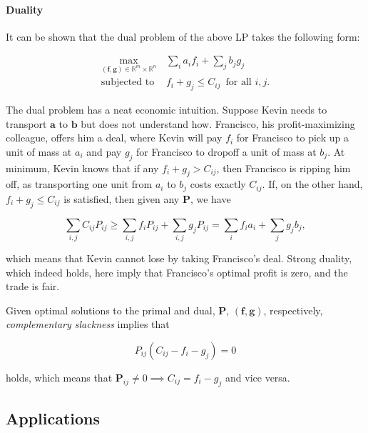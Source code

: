 \documentclass{article}
\renewcommand{\b}{\mathbf}
\newcommand{\R}{\mathbb{R}}
\theoremstyle{definition}
\theoremstyle{remark}
\begin{document}
\paragraph{Duality} It can be shown that the dual problem of the above LP takes
 the following form:

\begin{align*}
\max_{(\b f, \b g) \in \R^{m} \times \R^n} \, & \sum_i a_i f_i + \sum_j b_j g_j
\\ 
\text{subjected to } & f_i + g_j \le C_{ij}\, \text{ for all $i,j$}.
\end{align*}

The dual problem has a neat economic intuition. Suppose Kevin needs to transport
$\b a$ to $\b b$ but does not understand how. Francisco, his profit-maximizing
colleague, offers him a deal, where Kevin will pay $f_i$ for Francisco to pick
up a unit of mass at $a_i$ and pay $g_j$ for Francisco to dropoff a unit of mass
at $b_j.$ At minimum, Kevin knows that if any $f_i + g_j > C_ {ij}$, then
Francisco is ripping him off, as transporting one unit from $a_i$ to $b_j$ costs
exactly $C_{ij}$. If, on the other hand, $f_i + g_j \le C_{ij}$ is satisfied,
then given any $\b P$, we have

\[
\sum_{i,j} C_{ij}P_{ij} \ge \sum_{i,j} f_i P_{ij} + \sum_{i,j} g_j P_{ij} =
\sum_i f_i a_i + \sum_j g_j b_j \tag{Weak duality},
\]


which means that Kevin cannot lose by taking Francisco's deal. Strong duality,
which indeed holds, here imply that Francisco's optimal profit is zero, and the
trade is fair.


Given optimal solutions to the primal and dual, $\b P$, $(\b f, \b g)$,
respectively, \emph{complementary slackness} implies that

\[ P_{ij} (C_{ij} - f_i - g_j) = 0 \tag{Complementary slackness} \]

holds, which means that $\b P_{ij} \neq 0 \implies C_{ij} = f_i - g_j$ and
vice versa. 
\subsection{Applications} %
\label{sub:applications}
\end{document}
